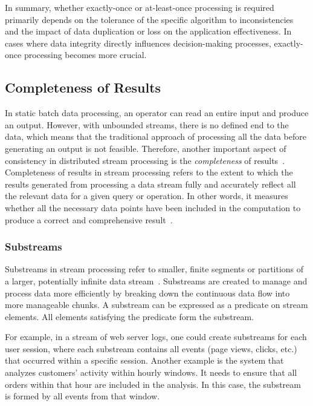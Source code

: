 In summary, whether exactly-once or at-least-once processing is required primarily depends on the tolerance of the specific algorithm to inconsistencies and the impact of data duplication or loss on the application effectiveness. In cases where data integrity directly influences decision-making processes, exactly-once processing becomes more crucial.

\subsection{Completeness of Results}
\label{completeness}

In static batch data processing, an operator can read an entire input and produce an output. However, with unbounded streams, there is no defined end to the data, which means that the traditional approach of processing all the data before generating an output is not feasible. Therefore, another important aspect of consistency in distributed stream processing is the {\em completeness} of results~\cite{Tucker:2003:EPS:776752.776780}. Completeness of results in stream processing refers to the extent to which the results generated from processing a data stream fully and accurately reflect all the relevant data for a given query or operation. In other words, it measures whether all the necessary data points have been included in the computation to produce a correct and comprehensive result~\cite{akidau2015streaming}.

\subsubsection{Substreams}

Substreams in stream processing refer to smaller, finite segments or partitions of a larger, potentially infinite data stream~\cite{Tucker:2003:EPS:776752.776780}. Substreams are created to manage and process data more efficiently by breaking down the continuous data flow into more manageable chunks. A substream can be expressed as a predicate on stream elements. All elements satisfying the predicate form the substream.

For example, in a stream of web server logs, one could create substreams for each user session, where each substream contains all events (page views, clicks, etc.) that occurred within a specific session. Another example is the system that analyzes customers' activity within hourly windows. It needs to ensure that all orders within that hour are included in the analysis. In this case, the substream is formed by all events from that window.


